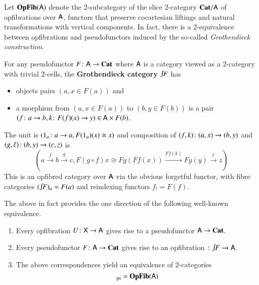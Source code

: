 \documentclass[reqno]{amsart}
\begin{document}
Let $\mathbf{OpFib}(\mathsf{A})$ denote the 2-subcategory of the slice 2-category $\mathbf{Cat}/ \mathsf{A}$ of opfibrations over $\mathsf{A}$, functors that preserve cocartesian liftings and natural transformations with vertical components. In fact, there is a 2-equivalence between opfibrations and pseudofunctors induced by the so-called \emph{Grothendieck construction}. 
\begin{defn}\label{def:GrothCat}
For any pseudofunctor $F\colon\mathsf{A}\to\mathbf{Cat}$ where $\mathsf{A}$ is a category viewed as a 2-category with trivial 2-cells, the \textbf{Grothendieck category}
$\inta F$ has
\begin{itemize}
\item objects pairs $(a, x \in F(a))$ and
\item a morphism from $(a, x \in F(a))$ to $(b, y\in F(b))$ is a pair $(f \colon a \to b,k \colon F(f)(x) \to y)\in\mathsf{A}\times F(b)$.
\end{itemize}
The unit is $(1_a\colon a\to a,F(1_a)(x)\cong x)$ and composition of $(f,k)\colon(a,x)\to(b,y)$ and $(g,\ell)\colon(b,y)\to(c,z)$ is
\begin{equation}\label{eq:compGrothcat}
\left(a\xrightarrow{f}b\xrightarrow{g}c, F(g\circ f)x\cong Fg(Ff(x))\xrightarrow{Ff(k)}Fg(y)\xrightarrow{\ell}z\right) 
\end{equation}
This is an opfibred category over $\mathsf{A}$ via the obvious forgetful functor, with fibre categories $(\inta F)_a=F(a)$ and reindexing functors $f_!=F(f)$.
\end{defn}
The above in fact provides the one direction of the following well-known equivalence.

\begin{thm}\label{thm:Grothendieck}\hfill
    \begin{enumerate}
        \item Every opfibration $U \colon \mathsf{X} \to \mathsf{A}$ gives rise to a pseudofunctor $\mathsf{A} \to \mathbf{Cat}$.
        \item Every pseudofunctor $F \colon \mathsf{A} \to \mathbf{Cat}$ gives rise to  an opfibration $\maps \inta F\to\A$.
        \item The above correspondences yield an equivalence of 2-categories 
        \begin{displaymath}
            [\A,\Cat]_\pse \simeq \OpFib(\A)
        \end{displaymath}
    \end{enumerate}
\end{thm}
\end{document}
